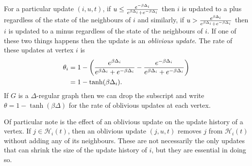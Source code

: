 	For a particular update $(i, u, t)$, if $u \leq \frac{e^{-\beta \Delta_i}}{e^{\beta \Delta_i} + e^{-\beta \Delta_i}}$ then $i$ is updated to a plus regardless of the state of the neighbours of $i$ and similarly, if $u > \frac{e^{\beta \Delta_i}}{e^{\beta \Delta_i} + e^{-\beta \Delta_i}}$ then $i$ is updated to a minus regardless of the state of the neighbours of $i$. If one of these two things happens then the update is an \emph{oblivious update}. The rate of these updates at vertex $i$ is
	\begin{align}
		\theta_i &= 1 - \left(\frac{e^{\beta \Delta_i}}{e^{\beta \Delta_i} + e^{-\beta \Delta_i}} - \frac{e^{-\beta \Delta_i}}{e^{\beta \Delta_i} + e^{-\beta \Delta_i}}\right)\\
			&= 1 - \tanh(\beta \Delta_i).
	\end{align}
	If $G$ is a $\Delta$-regular graph then we can drop the subscript and write $\theta = 1 - \tanh(\beta \Delta)$ for the rate of oblivious updates at each vertex.

	Of particular note is the effect of an oblivious update on the update history of a vertex. If $j \in \mathcal{H}_i(t)$, then an oblivious update $(j, u, t)$ removes $j$ from $\mathcal{H}_i(t)$ without adding any of its neighbours. These are not necessarily the only updates that can shrink the size of the update history of $i$, but they are essential in doing so.

	

